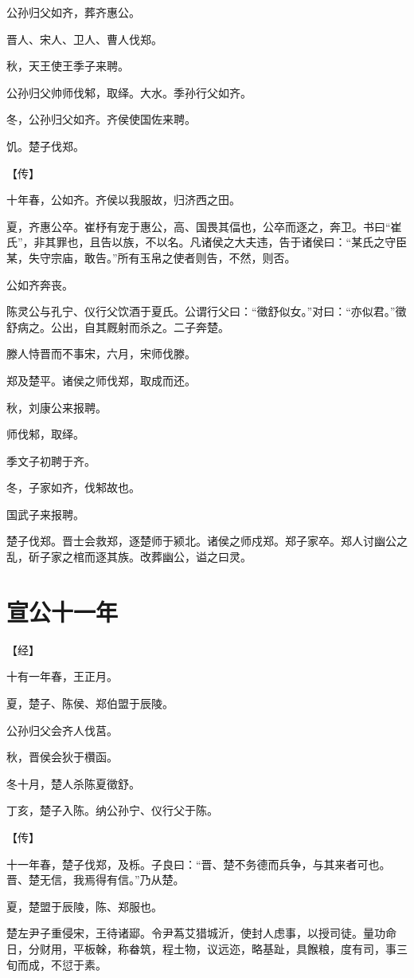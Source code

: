 \documentclass[a4paper,12pt,UTF8,twoside]{ctexbook}
\begin{document}
公孙归父如齐，葬齐惠公。

晋人、宋人、卫人、曹人伐郑。

秋，天王使王季子来聘。

公孙归父帅师伐邾，取绎。大水。季孙行父如齐。

冬，公孙归父如齐。齐侯使国佐来聘。

饥。楚子伐郑。

【传】

十年春，公如齐。齐侯以我服故，归济西之田。

夏，齐惠公卒。崔杼有宠于惠公，高、国畏其偪也，公卒而逐之，奔卫。书曰“崔氏”，非其罪也，且告以族，不以名。凡诸侯之大夫违，告于诸侯曰：“某氏之守臣某，失守宗庙，敢告。”所有玉帛之使者则告，不然，则否。

公如齐奔丧。

陈灵公与孔宁、仪行父饮酒于夏氏。公谓行父曰：“徵舒似女。”对曰：“亦似君。”徵舒病之。公出，自其厩射而杀之。二子奔楚。

滕人恃晋而不事宋，六月，宋师伐滕。

郑及楚平。诸侯之师伐郑，取成而还。

秋，刘康公来报聘。

师伐邾，取绎。

季文子初聘于齐。

冬，子家如齐，伐邾故也。

国武子来报聘。

楚子伐郑。晋士会救郑，逐楚师于颍北。诸侯之师戍郑。郑子家卒。郑人讨幽公之乱，斫子家之棺而逐其族。改葬幽公，谥之曰灵。

\chapter{宣公十一年}


【经】

十有一年春，王正月。

夏，楚子、陈侯、郑伯盟于辰陵。

公孙归父会齐人伐莒。

秋，晋侯会狄于欑函。

冬十月，楚人杀陈夏徵舒。

丁亥，楚子入陈。纳公孙宁、仪行父于陈。

【传】

十一年春，楚子伐郑，及栎。子良曰：“晋、楚不务德而兵争，与其来者可也。晋、楚无信，我焉得有信。”乃从楚。

夏，楚盟于辰陵，陈、郑服也。

楚左尹子重侵宋，王待诸郔。令尹蒍艾猎城沂，使封人虑事，以授司徒。量功命日，分财用，平板榦，称畚筑，程土物，议远迩，略基趾，具餱粮，度有司，事三旬而成，不愆于素。
\end{document}
